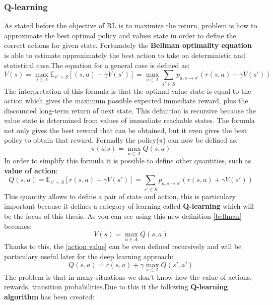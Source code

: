\subsubsection{Q-learning}
As stated before the objective of RL is to maximize the return, problem is how to approximate the best optimal policy and values state in order to define the correct actions for given state. Fortunately the \textbf{Bellman optimality equation} is able to estimate approximately the best action to take on deterministic and statistical case.The equation for a general case is defined as:
\begin{equation}\label{bellman}
	V(s) = \max_{a \in A} \mathbb{E}_{s' \sim S}[(s,a) + \gamma V(s')] = \max_{a \in A} \sum_{s' \in S} p_{a, s \to s'}(r(s,a) + \gamma V(s'))
\end{equation}
The interpretation of this formula is that the optimal value state is equal to the action which gives the maximum possible expected immediate reward, plus the discounted long-term return of next state. This definition is recursive because the value state is determined from values of immediate reachable states. The formula not only gives the best reward that can be obtained, but it even gives the best policy to obtain that reward.
Formally the policy($\pi$) can now be defined as:
\begin{equation}\label{policy q learning}
	\pi(a | s) = \max_{a \in A} Q(s,a)
\end{equation}
In order to simplify this formula it is possible to define other quantities, such as \textbf{value of action}:
\begin{equation}\label{action value}
	Q(s,a) = \mathbb{E}_{s' \sim S}[r(s,a)+ \gamma V(s')] = \sum_{s' \in S} p_{a, s \to s'}(r(s,a) + \gamma V(s'))
\end{equation}
This quantity allows to define a pair of state and action, this is particulary important because it defines a category of learning called \textbf{Q-learning} which will be the focus of this thesis. As you can see using this new definition \ref{bellman} becomes:
\begin{equation*}
	V(s) = \max_{a \in A} Q(s,a)
\end{equation*}
Thanks to this, the \ref{action value} can be even defined recursively and will be particulary useful later for the deep learning approach:
\begin{equation}\label{recursive}
	Q(s,a) = r(s,a) + \gamma \max_{a \in A} Q(s',a')
\end{equation} 
The problem is that in many situations we don't know how the value of actions, rewards, transition probabilities.Due to this it the following \textbf{Q-learning algorithm} has been created:
